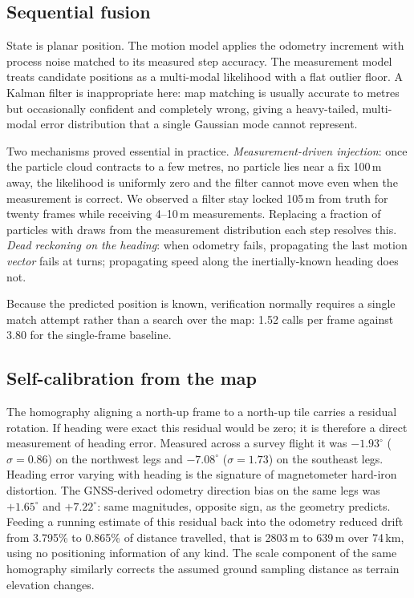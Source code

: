 \documentclass[conference]{IEEEtran}
\begin{document}
\subsection{Sequential fusion}
State is planar position. The motion model applies the odometry increment with
process noise matched to its measured step accuracy. The measurement model
treats candidate positions as a multi-modal likelihood with a flat outlier
floor. A Kalman filter is inappropriate here: map matching is usually accurate
to metres but occasionally confident and completely wrong, giving a
heavy-tailed, multi-modal error distribution that a single Gaussian mode cannot
represent.

Two mechanisms proved essential in practice. \emph{Measurement-driven
injection}: once the particle cloud contracts to a few metres, no particle lies
near a fix 100\,m away, the likelihood is uniformly zero and the filter cannot
move even when the measurement is correct. We observed a filter stay locked
105\,m from truth for twenty frames while receiving 4--10\,m measurements.
Replacing a fraction of particles with draws from the measurement distribution
each step resolves this. \emph{Dead reckoning on the heading}: when odometry
fails, propagating the last motion \emph{vector} fails at turns; propagating
speed along the inertially-known heading does not.

Because the predicted position is known, verification normally requires a
single match attempt rather than a search over the map: 1.52 calls per frame
against 3.80 for the single-frame baseline.

\subsection{Self-calibration from the map}
\label{sec:selfcal}
The homography aligning a north-up frame to a north-up tile carries a residual
rotation. If heading were exact this residual would be zero; it is therefore a
direct measurement of heading error. Measured across a survey flight it was
$-1.93^\circ$ ($\sigma=0.86$) on the northwest legs and $-7.08^\circ$
($\sigma=1.73$) on the southeast legs. Heading error varying with heading is
the signature of magnetometer hard-iron distortion. The GNSS-derived odometry
direction bias on the same legs was $+1.65^\circ$ and $+7.22^\circ$: same
magnitudes, opposite sign, as the geometry predicts. Feeding a running estimate
of this residual back into the odometry reduced drift from 3.795\% to 0.865\%
of distance travelled, that is 2803\,m to 639\,m over 74\,km, using no
positioning information of any kind. The scale component of the same homography
similarly corrects the assumed ground sampling distance as terrain elevation
changes.
\end{document}
